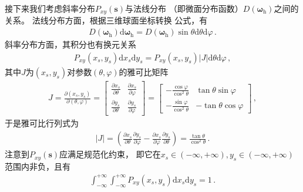 接下来我们考虑斜率分布$P_{xy}({\bm s})$与法线分布
（即微面分布函数）$D({\bm\omega}_{\mathrm{h}})$之间的关系。
法线分布方面，根据三维球面坐标转换
公式，有
\begin{align}\label{eq:08-ex01-D_sphere}
    D({\bm\omega}_{\mathrm{h}})\mathrm{d}{\bm\omega}_{\mathrm{h}}
    =D({\bm\omega}_{\mathrm{h}})\sin\theta\mathrm{d}\theta\mathrm{d}\varphi\, .
\end{align}
斜率分布方面，其积分也有换元关系
\begin{align}\label{eq:08-ex01-Pxy-Jacobian}
    P_{xy}(x_s,y_s)\mathrm{d}x_s\mathrm{d}y_s
    =P_{xy}(x_s,y_s)|J|\mathrm{d}\theta\mathrm{d}\varphi\, ,
\end{align}
其中$J$为$(x_s,y_s)$对参数$(\theta,\varphi)$的雅可比矩阵
\begin{align}
    J=\displaystyle\frac{\partial(x_s,y_s)}{\partial(\theta,\varphi)}
    =\displaystyle\left[\begin{array}{cc}
            \displaystyle\frac{\partial x_s}{\partial \theta} &
            \displaystyle\frac{\partial x_s}{\partial \varphi}  \\
            \displaystyle\frac{\partial y_s}{\partial \theta} &
            \displaystyle\frac{\partial y_s}{\partial \varphi}
        \end{array}\right]
    =\displaystyle\left[\begin{array}{rr}
            \displaystyle -\frac{\cos\varphi}{\cos^2\theta} &
            \displaystyle \tan\theta\sin\varphi               \\
            \displaystyle -\frac{\sin\varphi}{\cos^2\theta} &
            \displaystyle -\tan\theta\cos\varphi
        \end{array}\right]\, ,
\end{align}
于是雅可比行列式为
\begin{align}\label{eq:08-ex01-Jacobian-slope-normals}
    |J|=\left(\frac{\partial x_s}{\partial \theta}\frac{\partial y_s}{\partial \varphi}
    -\frac{\partial x_s}{\partial \varphi}\frac{\partial y_s}{\partial \theta}\right)
    =\frac{\tan\theta}{\cos^2\theta}\, .
\end{align}
注意到$P_{xy}({\bm s})$应满足规范化约束，
即它在$x_s\in(-\infty,+\infty),y_s\in(-\infty,+\infty)$范围内非负，且有
\begin{align}\label{eq:08-ex01-normal-of-P2D}
    \int_{-\infty}^{+\infty}\int_{-\infty}^{+\infty}
    P_{xy}(x_s,y_s)\mathrm{d}x_s\mathrm{d}y_s=1\, .
\end{align}
